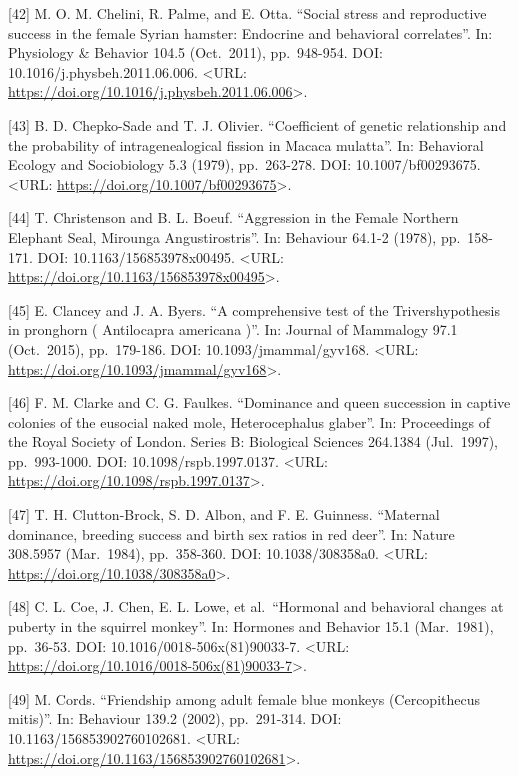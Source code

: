 \documentclass[
]{article}
\begin{document}
{[}42{]} M. O. M. Chelini, R. Palme, and E. Otta. ``Social stress and
reproductive success in the female Syrian hamster: Endocrine and
behavioral correlates''. In: Physiology \& Behavior 104.5 (Oct.~2011),
pp.~948-954. DOI: 10.1016/j.physbeh.2011.06.006. \textless URL:
\url{https://doi.org/10.1016/j.physbeh.2011.06.006}\textgreater.

{[}43{]} B. D. Chepko-Sade and T. J. Olivier. ``Coefficient of genetic
relationship and the probability of intragenealogical fission in Macaca
mulatta''. In: Behavioral Ecology and Sociobiology 5.3 (1979),
pp.~263-278. DOI: 10.1007/bf00293675. \textless URL:
\url{https://doi.org/10.1007/bf00293675}\textgreater.

{[}44{]} T. Christenson and B. L. Boeuf. ``Aggression in the Female
Northern Elephant Seal, Mirounga Angustirostris''. In: Behaviour 64.1-2
(1978), pp.~158-171. DOI: 10.1163/156853978x00495. \textless URL:
\url{https://doi.org/10.1163/156853978x00495}\textgreater.

{[}45{]} E. Clancey and J. A. Byers. ``A comprehensive test of the
Trivershypothesis in pronghorn ( Antilocapra americana )''. In: Journal
of Mammalogy 97.1 (Oct.~2015), pp.~179-186. DOI: 10.1093/jmammal/gyv168.
\textless URL: \url{https://doi.org/10.1093/jmammal/gyv168}\textgreater.

{[}46{]} F. M. Clarke and C. G. Faulkes. ``Dominance and queen
succession in captive colonies of the eusocial naked mole,
Heterocephalus glaber''. In: Proceedings of the Royal Society of London.
Series B: Biological Sciences 264.1384 (Jul.~1997), pp.~993-1000. DOI:
10.1098/rspb.1997.0137. \textless URL:
\url{https://doi.org/10.1098/rspb.1997.0137}\textgreater.

{[}47{]} T. H. Clutton-Brock, S. D. Albon, and F. E. Guinness.
``Maternal dominance, breeding success and birth sex ratios in red
deer''. In: Nature 308.5957 (Mar.~1984), pp.~358-360. DOI:
10.1038/308358a0. \textless URL:
\url{https://doi.org/10.1038/308358a0}\textgreater.

{[}48{]} C. L. Coe, J. Chen, E. L. Lowe, et al.~``Hormonal and
behavioral changes at puberty in the squirrel monkey''. In: Hormones and
Behavior 15.1 (Mar.~1981), pp.~36-53. DOI: 10.1016/0018-506x(81)90033-7.
\textless URL:
\url{https://doi.org/10.1016/0018-506x(81)90033-7}\textgreater.

{[}49{]} M. Cords. ``Friendship among adult female blue monkeys
(Cercopithecus mitis)''. In: Behaviour 139.2 (2002), pp.~291-314. DOI:
10.1163/156853902760102681. \textless URL:
\url{https://doi.org/10.1163/156853902760102681}\textgreater.
\end{document}
